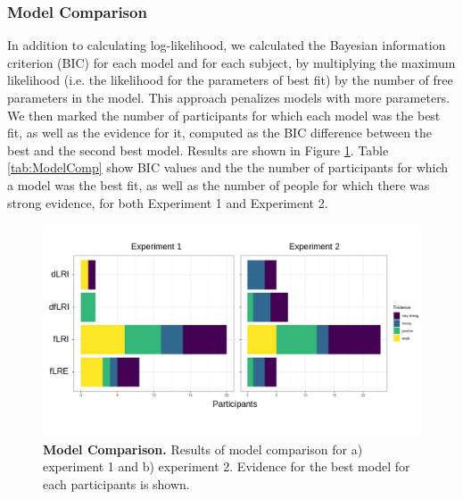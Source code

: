 \documentclass[a4paper,12pt]{article} 			%
\begin{document}
\subsubsection{Model Comparison}
In addition to calculating log-likelihood, we calculated the Bayesian information criterion (BIC) for each model and for each subject, by multiplying the maximum likelihood (i.e. the likelihood for the parameters of best fit) by the number of free parameters in the model. This approach penalizes models with more parameters. We then marked the number of participants for which each model was the best fit, as well as the evidence for it, computed as the BIC difference between the best and the second best model. Results are shown in Figure \ref{fig:ModelComparison}. Table \ref{tab:ModelComp} show BIC values and the the number of participants for which a model was the best fit, as well as the number of people for which there was strong evidence, for both Experiment 1 and Experiment 2. 


\begin{figure}[ht!]
\centerline
{\includegraphics[width=1\textwidth]{figures/ModelComparisonAll.jpg}}
\caption{\textbf{Model Comparison.} Results of model comparison for a) experiment 1 and b) experiment 2. Evidence for the best model for each participants is shown.}
\label{fig:ModelComparison}
\end{figure}
\end{document}
